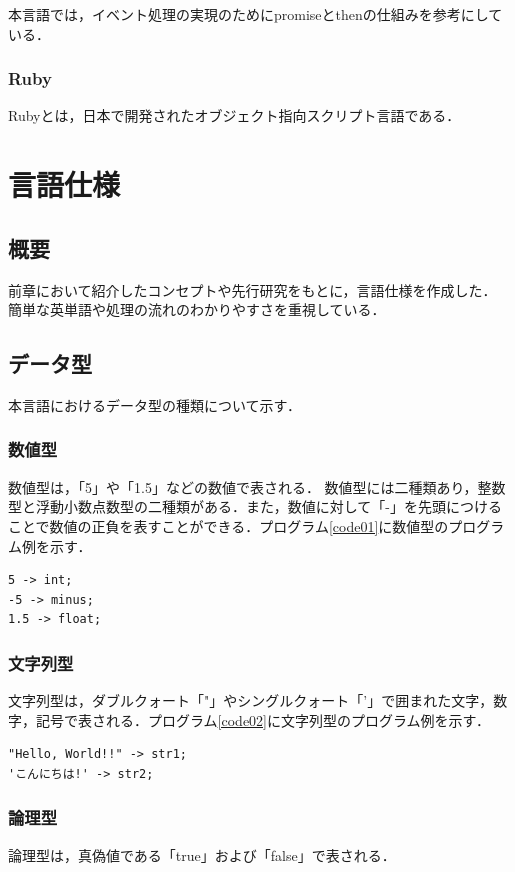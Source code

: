 \documentclass[10pt,a4j]{ltjsarticle}
\begin{document}
本言語では，イベント処理の実現のためにpromiseとthenの仕組みを参考にしている．

\subsubsection{Ruby}
Rubyとは，日本で開発されたオブジェクト指向スクリプト言語である．
\clearpage

\section{言語仕様}
\subsection{概要}
前章において紹介したコンセプトや先行研究\cite{senkou1,senkou2}をもとに，言語仕様を作成した．
簡単な英単語や処理の流れのわかりやすさを重視している．
\subsection{データ型}
本言語におけるデータ型の種類について示す．
\subsubsection{数値型}
数値型は，「5」や「1.5」などの数値で表される．
数値型には二種類あり，整数型と浮動小数点数型の二種類がある．また，数値に対して「-」を先頭につけることで数値の正負を表すことができる．プログラム\ref{code01}に数値型のプログラム例を示す．

\begin{lstlisting}[caption=数値型のプログラム例, label=code01]
5 -> int;
-5 -> minus;
1.5 -> float;
\end{lstlisting}

\subsubsection{文字列型}
文字列型は，ダブルクォート「"」やシングルクォート「'」で囲まれた文字，数字，記号で表される．プログラム\ref{code02}に文字列型のプログラム例を示す．

\begin{lstlisting}[caption=文字列型のプログラム例, label=code02]
"Hello, World!!" -> str1;
'こんにちは!' -> str2;
\end{lstlisting}

\subsubsection{論理型}
論理型は，真偽値である「true」および「false」で表される．
\end{document}
